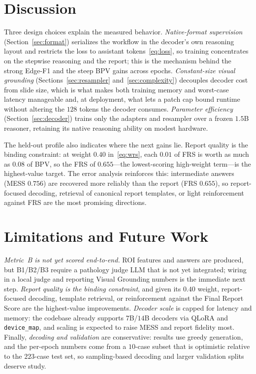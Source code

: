 \documentclass[11pt]{article}
\newcommand{\code}[1]{\texttt{\small #1}}
\begin{document}
\section{Discussion}
\label{sec:discussion}
Three design choices explain the measured behavior. \emph{Native-format
supervision} (Section~\ref{sec:format}) serializes the workflow in the decoder's
own reasoning layout and restricts the loss to assistant tokens~\eqref{eq:loss},
so training concentrates on the stepwise reasoning and the report; this is the
mechanism behind the strong Edge-F1 and the steep BPV gains across epochs. \emph{Constant-size visual grounding}
(Sections~\ref{sec:resampler} and~\ref{sec:complexity}) decouples decoder cost
from slide size, which is what makes both training memory and worst-case latency
manageable and, at deployment, what lets a patch cap bound runtime without
altering the $128$ tokens the decoder consumes. \emph{Parameter efficiency}
(Section~\ref{sec:decoder}) trains only the adapters and resampler over a frozen
$1.5$B reasoner, retaining its native reasoning ability on modest hardware.

The held-out profile also indicates where the next gains lie. Report quality is
the binding constraint: at weight $0.40$ in~\eqref{eq:wrs}, each $0.01$ of FRS is
worth as much as $0.08$ of BPV, so the FRS of $0.655$---the lowest-scoring
high-weight term---is the highest-value target. The error analysis reinforces
this: intermediate answers (MESS $0.756$) are recovered more reliably than the
report (FRS $0.655$), so report-focused decoding, retrieval of canonical report
templates, or light reinforcement against FRS are the most promising directions.

\section{Limitations and Future Work}
\label{sec:limits}
\emph{Metric~B is not yet scored end-to-end.} ROI features and answers are
produced, but B1/B2/B3 require a pathology judge LLM that is not yet integrated;
wiring in a local judge and reporting Visual Grounding numbers is the immediate
next step. \emph{Report quality is the binding constraint}, and given its $0.40$
weight, report-focused decoding, template retrieval, or reinforcement against the
Final Report Score are the highest-value improvements. \emph{Decoder scale} is
capped for latency and memory: the codebase already supports $7$B/$14$B decoders
via QLoRA and \code{device\_map}, and scaling is expected to raise MESS and report
fidelity most. Finally, \emph{decoding and validation} are conservative: results
use greedy generation, and the per-epoch numbers come from a $10$-case subset that
is optimistic relative to the $223$-case test set, so sampling-based decoding and
larger validation splits deserve study.
\end{document}
